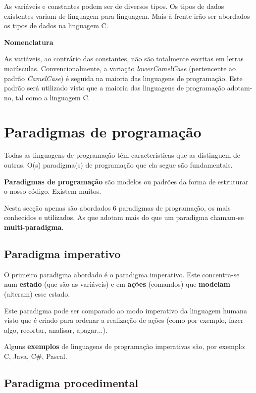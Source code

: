 As variáveis e constantes podem ser de diversos tipos. Os tipos de dados existentes variam de linguagem para linguagem. Mais à frente irão ser abordados os tipos de dados na linguagem C.

\begin{mdframed}[backgroundcolor=cinzaclaro, linewidth=0pt]
\textbf{Nomenclatura} 

As variáveis, ao contrário das constantes, não são totalmente escritas em letras maiúsculas. Convencionalmente, a variação \textit{lowerCamelCase} (pertencente ao padrão \textit{CamelCase}) é seguida na maioria das linguagens de programação. Este padrão será utilizado visto que a maioria das linguagens de programação adotam-no, tal como a linguagem C.
\end{mdframed}

\section{Paradigmas de programação}

Todas as linguagens de programação têm características que as distinguem de outras. O(s) paradigma(s) de programação que ela segue são fundamentais.

\begin{defi}
\textbf{Paradigmas de programação} são modelos ou padrões da forma de estruturar o nosso código. Existem muitos. 
\end{defi}

Nesta secção apenas são abordados 6 paradigmas de programação, os mais conhecidos e utilizados. As que adotam mais do que um paradigma chamam-se \textbf{multi-paradigma}.

\subsection{Paradigma imperativo}

O primeiro paradigma abordado é o paradigma imperativo. Este concentra-se num \textbf{estado} (que são as variáveis) e em \textbf{ações} (comandos) que \textbf{modelam} (alteram) esse estado.

Este paradigma pode ser comparado ao modo imperativo da linguagem humana visto que é criado para ordenar a realização de ações (como por exemplo, fazer algo, recortar, analisar, apagar...).

Alguns \textbf{exemplos} de linguagens de programação imperativas são, por exemplo: C, Java, C\#, Pascal.

\subsection{Paradigma procedimental}

